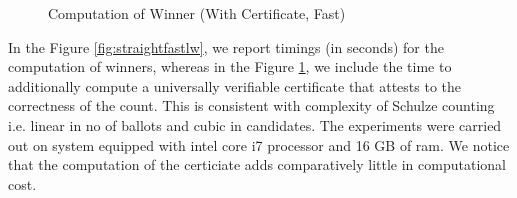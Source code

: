    
 \begin{figure}[!htb]
        \caption{\label{fig:straightfastlv} Computation of Winner (With Certificate, Fast)}
\end{figure}   




\noindent
In the Figure \ref{fig:straightfastlw}, we report timings (in seconds) for the computation of
winners, whereas in the Figure \ref{fig:straightfastlv}, we include the time to additionally
compute a universally verifiable certificate that attests  to the
correctness of the count. This is consistent with complexity of Schulze 
counting i.e. linear in no of ballots and cubic in candidates. 
The experiments were carried out on system 
equipped with intel core i7 processor and 16 GB of ram. We notice that the
computation of the certiciate adds comparatively little in
computational cost. 

